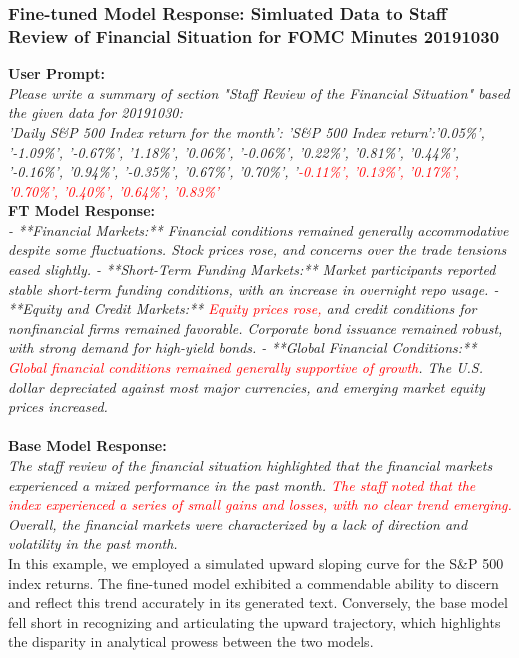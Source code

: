 \subsubsection{Fine-tuned Model Response: Simluated Data to Staff Review of Financial Situation for FOMC Minutes 20191030}\label{simualted ft}
\textbf{User Prompt:}\\
{\footnotesize
\textit{
Please write a summary of section "Staff Review of the Financial Situation" based the given data for 20191030: \\
'Daily S\&P 500 Index return for the month': 'S\&P 500 Index return':'0.05\%', '-1.09\%', '-0.67\%', '1.18\%', '0.06\%', '-0.06\%', '0.22\%', '0.81\%', '0.44\%', '-0.16\%', '0.94\%', '-0.35\%', '0.67\%', '0.70\%', '\textcolor{red}{-0.11\%', '0.13\%', '0.17\%', '0.70\%', '0.40\%', '0.64\%', '0.83\%'}}
}\\
\textbf{FT Model Response:}\\
{\footnotesize
\textit{
    - **Financial Markets:** Financial conditions remained generally accommodative despite some fluctuations. Stock prices rose, and concerns over the trade tensions eased slightly.
    - **Short-Term Funding Markets:** Market participants reported stable short-term funding conditions, with an increase in overnight repo usage.
    - **Equity and Credit Markets:** \textcolor{red}{Equity prices rose,} and credit conditions for nonfinancial firms remained favorable. Corporate bond issuance remained robust, with strong demand for high-yield bonds.
    - **Global Financial Conditions:** \textcolor{red}{Global financial conditions remained generally supportive of growth}. The U.S. dollar depreciated against most major currencies, and emerging market equity prices increased.
}}\\
~\\
\textbf{Base Model Response:}\\
{\footnotesize
\textit{
The staff review of the financial situation highlighted that the financial markets experienced a mixed performance in the past month. \textcolor{red}{The staff noted that the index experienced a series of small gains and losses, with no clear trend emerging.} Overall, the financial markets were characterized by a lack of direction and volatility in the past month.
}}\\



In this example, we employed a simulated upward sloping curve for the S\&P 500 index returns. The fine-tuned model exhibited a commendable ability to discern and reflect this trend accurately in its generated text. Conversely, the base model fell short in recognizing and articulating the upward trajectory, which highlights the disparity in analytical prowess between the two models. 

